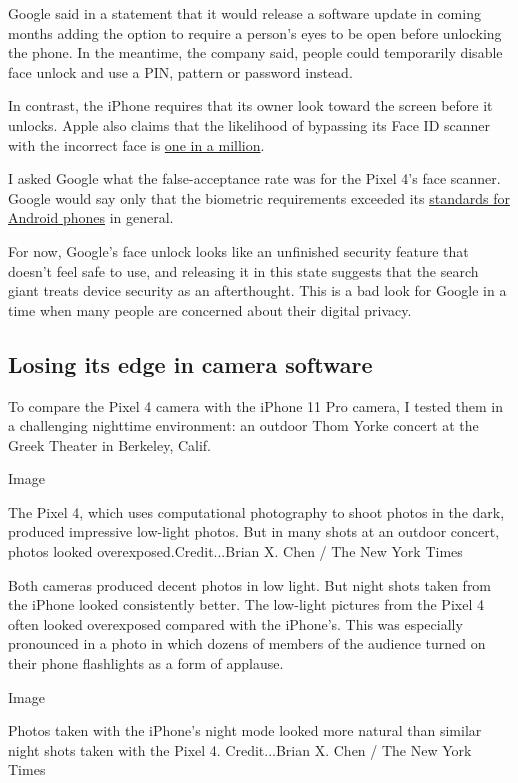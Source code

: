 Google said in a statement that it would release a software update in
coming months adding the option to require a person's eyes to be open
before unlocking the phone. In the meantime, the company said, people
could temporarily disable face unlock and use a PIN, pattern or password
instead.

In contrast, the iPhone requires that its owner look toward the screen
before it unlocks. Apple also claims that the likelihood of bypassing
its Face ID scanner with the incorrect face is
\href{https://support.apple.com/en-us/HT208108}{one in a million}.

I asked Google what the false-acceptance rate was for the Pixel 4's face
scanner. Google would say only that the biometric requirements exceeded
its \href{https://source.android.com/compatibility/cdd}{standards for
Android phones} in general.

For now, Google's face unlock looks like an unfinished security feature
that doesn't feel safe to use, and releasing it in this state suggests
that the search giant treats device security as an afterthought. This is
a bad look for Google in a time when many people are concerned about
their digital privacy.

\hypertarget{losing-its-edge-in-camera-software}{%
\subsection{Losing its edge in camera
software}\label{losing-its-edge-in-camera-software}}

To compare the Pixel 4 camera with the iPhone 11 Pro camera, I tested
them in a challenging nighttime environment: an outdoor Thom Yorke
concert at the Greek Theater in Berkeley, Calif.

Image

The Pixel 4, which uses computational photography to shoot photos in the
dark, produced impressive low-light photos. But in many shots at an
outdoor concert, photos looked overexposed.Credit...Brian X. Chen / The
New York Times

Both cameras produced decent photos in low light. But night shots taken
from the iPhone looked consistently better. The low-light pictures from
the Pixel 4 often looked overexposed compared with the iPhone's. This
was especially pronounced in a photo in which dozens of members of the
audience turned on their phone flashlights as a form of applause.

Image

Photos taken with the iPhone's night mode looked more natural than
similar night shots taken with the Pixel 4. Credit...Brian X. Chen / The
New York Times

